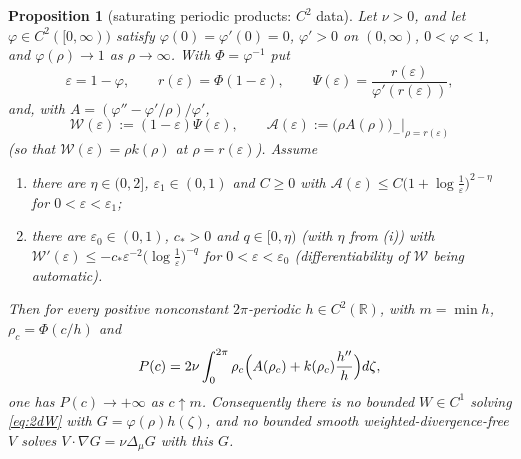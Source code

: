 \documentclass[11pt]{article}
\newtheorem{proposition}[theorem]{Proposition}
\theoremstyle{definition}
\newcommand{\R}{\mathbb{R}}
\begin{document}
\begin{proposition}[saturating periodic products: $C^2$ data]\label{prop:periodicflat}
Let $\nu>0$, and let $\varphi\in C^2([0,\infty))$ satisfy
$\varphi(0)=\varphi'(0)=0$, $\varphi'>0$ on $(0,\infty)$, $0<\varphi<1$, and
$\varphi(\rho)\to1$ as $\rho\to\infty$. With $\Phi=\varphi^{-1}$ put
\begin{equation}
\varepsilon=1-\varphi,\qquad r(\varepsilon)=\Phi(1-\varepsilon),\qquad
\Psi(\varepsilon)=\frac{r(\varepsilon)}{\varphi'(r(\varepsilon))},
\end{equation}
and, with $A=(\varphi''-\varphi'/\rho)/\varphi'$,
\begin{equation}
\mathcal W(\varepsilon):=(1-\varepsilon)\Psi(\varepsilon),\qquad
\mathcal A(\varepsilon):=\bigl(\rho A(\rho)\bigr)_-\big|_{\rho=r(\varepsilon)}
\end{equation}
(so that $\mathcal W(\varepsilon)=\rho k(\rho)$ at $\rho=r(\varepsilon)$). Assume
\begin{enumerate}
\item[(i)] there are $\eta\in(0,2]$, $\varepsilon_1\in(0,1)$ and $C\ge0$ with
$\mathcal A(\varepsilon)\le C\bigl(1+\log\frac1\varepsilon\bigr)^{2-\eta}$
for $0<\varepsilon<\varepsilon_1$;
\item[(ii)] there are $\varepsilon_0\in(0,1)$, $c_*>0$ and $q\in[0,\eta)$
(with $\eta$ from (i)) with
$\mathcal W'(\varepsilon)\le-c_*\varepsilon^{-2}\bigl(\log\frac1\varepsilon\bigr)^{-q}$
for $0<\varepsilon<\varepsilon_0$ (differentiability of $\mathcal W$ being
automatic).
\end{enumerate}
Then for every positive nonconstant $2\pi$-periodic $h\in C^2(\R)$, with
$m=\min h$, $\rho_c=\Phi(c/h)$ and
\begin{equation}
P(c)=2\nu\int_0^{2\pi}\rho_c\Bigl(A(\rho_c)+k(\rho_c)\frac{h''}{h}\Bigr)d\zeta,
\end{equation}
one has $P(c)\to+\infty$ as $c\uparrow m$. Consequently there is no bounded
$W\in C^1$ solving \eqref{eq:2dW} with $G=\varphi(\rho)h(\zeta)$, and no
bounded smooth weighted-divergence-free $V$ solves
$V\cdot\nabla G=\nu\Delta_\mu G$ with this $G$.
\end{proposition}
\end{document}
